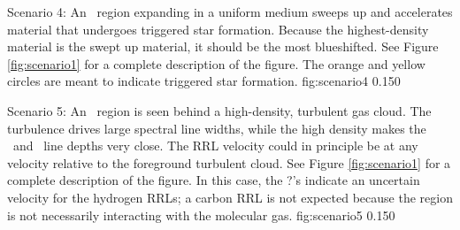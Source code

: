 {Scenario 4: An \uchii\ region expanding in a uniform medium sweeps up and
accelerates material that undergoes triggered star formation.  Because the
highest-density material is the swept up material, it should be the most
blueshifted.  See Figure \ref{fig:scenario1} for a complete description of
the figure.  The orange and yellow circles are meant to indicate triggered star
formation.}
{fig:scenario4}
{0.15}{0}

{Scenario 5: An \uchii\ region is seen behind a high-density, turbulent gas
cloud.  The turbulence drives large spectral line widths, while the high density makes
the \oneone\ and \twotwo\ line depths very close.   The RRL velocity could in
principle be at any velocity relative to the foreground turbulent cloud.  See
Figure \ref{fig:scenario1} for a complete description of the figure.  In this case,
the ?'s indicate an uncertain velocity for the hydrogen RRLs; a carbon RRL is not
expected because the  region is not necessarily interacting with the
molecular gas.}
{fig:scenario5}
{0.15}{0}


